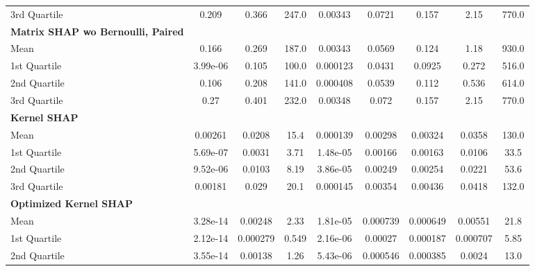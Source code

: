 {\begin{tabular} {lcccccccc}
\hspace{7pt}3rd Quartile & 0.209 & 0.366 & 247.0 & 0.00343 & 0.0721 & 0.157 & 2.15 & 770.0 \\ 
\addlinespace[1ex] 
\textbf{Matrix SHAP wo Bernoulli, Paired} &  &  &  &  &  &  &  &  \\ 
\hspace{7pt}Mean & 0.166 & 0.269 & 187.0 & 0.00343 & 0.0569 & 0.124 & 1.18 & 930.0 \\ 
\hspace{7pt}1st Quartile & 3.99e-06 & 0.105 & 100.0 & 0.000123 & 0.0431 & 0.0925 & 0.272 & 516.0 \\ 
\hspace{7pt}2nd Quartile & 0.106 & 0.208 & 141.0 & 0.000408 & 0.0539 & 0.112 & 0.536 & 614.0 \\ 
\hspace{7pt}3rd Quartile & 0.27 & 0.401 & 232.0 & 0.00348 & 0.072 & 0.157 & 2.15 & 770.0 \\ 
\addlinespace[1ex] 
\textbf{Kernel SHAP} &  &  &  &  &  &  &  &  \\ 
\hspace{7pt}Mean & 0.00261 & 0.0208 & 15.4 & 0.000139 & 0.00298 & 0.00324 & 0.0358 & 130.0 \\ 
\hspace{7pt}1st Quartile & 5.69e-07 & 0.0031 & 3.71 & 1.48e-05 & 0.00166 & 0.00163 & 0.0106 & 33.5 \\ 
\hspace{7pt}2nd Quartile & 9.52e-06 & 0.0103 & 8.19 & 3.86e-05 & 0.00249 & 0.00254 & 0.0221 & 53.6 \\ 
\hspace{7pt}3rd Quartile & 0.00181 & 0.029 & 20.1 & 0.000145 & 0.00354 & 0.00436 & 0.0418 & 132.0 \\ 
\addlinespace[1ex] 
\textbf{Optimized Kernel SHAP} &  &  &  &  &  &  &  &  \\ 
\hspace{7pt}Mean & \cellcolor{silver!60}3.28e-14 & 0.00248 & 2.33 & 1.81e-05 & 0.000739 & 0.000649 & 0.00551 & \cellcolor{bronze!60}21.8 \\ 
\hspace{7pt}1st Quartile & \cellcolor{bronze!60}2.12e-14 & 0.000279 & 0.549 & 2.16e-06 & 0.00027 & 0.000187 & 0.000707 & 5.85 \\ 
\hspace{7pt}2nd Quartile & \cellcolor{silver!60}3.55e-14 & 0.00138 & 1.26 & 5.43e-06 & 0.000546 & \cellcolor{bronze!60}0.000385 & 0.0024 & \cellcolor{bronze!60}13.0 \\ 

\end{tabular}}

